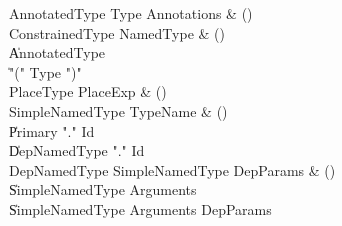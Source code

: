 \begin{bbgrammar}
 AnnotatedType  \label{prod:AnnotatedType}  \: Type Annotations & ()\\
 ConstrainedType  \label{prod:ConstrainedType}  \: NamedType & ()\\
    \| AnnotatedType\\
    \| \xcd"(" Type \xcd")"\\
 PlaceType  \label{prod:PlaceType}  \: PlaceExp & ()\\
 SimpleNamedType  \label{prod:SimpleNamedType}  \: TypeName & ()\\
    \| Primary \xcd"." Id\\
    \| DepNamedType \xcd"." Id\\
 DepNamedType  \label{prod:DepNamedType}  \: SimpleNamedType DepParams & ()\\
    \| SimpleNamedType Arguments\\
    \| SimpleNamedType Arguments DepParams\\
\end{bbgrammar}


